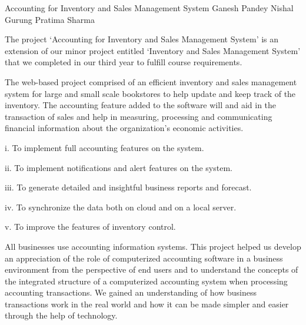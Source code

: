  \begin{conf-abstract}[]
 {Accounting for Inventory and Sales Management System}
 { Ganesh Pandey
 	Nishal Gurung
 	Pratima Sharma
 }
{}

The project ‘Accounting for Inventory and Sales Management System’ is an extension of our minor project entitled ‘Inventory and Sales Management System’ that we completed in our third year to fulfill course requirements.

The web-based project comprised of an efficient inventory and sales management system for large and small scale bookstores to help update and keep track of the inventory. The accounting feature added to the software will and aid in the transaction of sales and help in measuring, processing and communicating financial information about the organization's economic activities.

i.    To implement full accounting features on the system.

ii.    To implement notifications and alert features on the system.

iii.    To generate detailed and insightful business reports and forecast.

iv.    To synchronize the data both on cloud and on a local server. 

v.    To improve the features of inventory control.

All businesses use accounting information systems. This project helped us develop an appreciation of the role of computerized accounting software in a business environment from the perspective of end users and to understand the concepts of the integrated structure of a computerized accounting system when processing accounting transactions. 
We gained an understanding of how business transactions work in the real world and how it can be made simpler and easier through the help of technology.


\end{conf-abstract}
